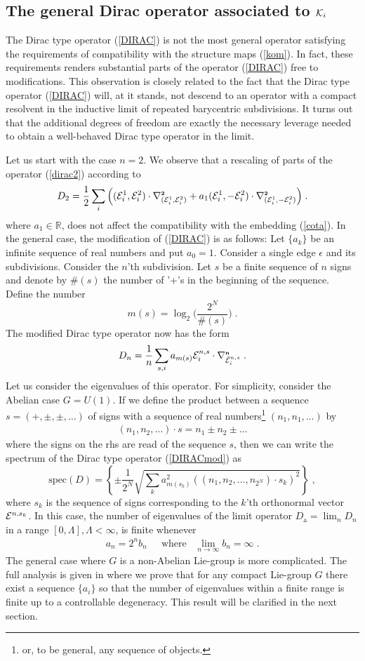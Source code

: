 \documentclass[12pt]{article}
\newcommand{\ba}{\begin{eqnarray}}
\newcommand{\ea}{\end{eqnarray}}
\def\e{\epsilon}
\def\ce{{\cal E}}
\def\ck{{\cal K}}
\newcommand{\nablato}{\nabla^{\mbox{\tiny\bf 2}}}
\begin{document}
\subsection{The general Dirac operator associated to $\ck_i$}

The Dirac type operator (\ref{DIRAC}) is not the most general operator satisfying the requirements of compatibility with the structure maps (\ref{kom}). In fact, these requirements renders substantial parts of the operator (\ref{DIRAC}) free to modifications. This observation is closely related to the fact that the Dirac type operator (\ref{DIRAC}) will, at it stands, not descend to an operator with a compact resolvent in the inductive limit of repeated barycentric subdivisions. It turns out that the additional degrees of freedom are exactly the necessary leverage needed to obtain a well-behaved Dirac type operator in the limit.


Let us start with the case $n=2$. We observe that a rescaling of parts of the operator (\ref{dirac2}) according to
\ba
D_2=\frac{1}{2}\sum_i\Big( (\ce^1_i,\ce^2_i)\cdot\nablato_{(\ce^1_i,\ce^2_i)} + a_1 (\ce^1_i,-\ce^2_i)\cdot\nablato_{(\ce^1_i,-\ce^2_i)}\Big)\;.
\label{dirac3}
\ea
where $a_1\in\mathbb{R}$, does not affect the compatibility with the embedding (\ref{cota}). In the general case, the modification of (\ref{DIRAC}) is as follows: Let $\{a_k\}$ be an infinite sequence of real numbers and put $a_0=1$. Consider a single edge $\e$ and its subdivisions. Consider the $n$'th subdivision. Let $s$ be a finite sequence of $n$ signs and denote by $\#(s)$ the number of '+'s in the beginning of the sequence. Define the number
\[
m(s)=\log_2\Big(\frac{2^N}{\#(s)} \Big)\;.
\]
The modified Dirac type operator now has the form
\ba
D_n = \frac{1}{n}\sum_{s,i}a_{m(s)}\ce^{n,s}_i\cdot \nabla^{\mbox{\tiny\bf n}}_{\hat{\ce}^{n,s}_i}\;.
\label{DIRACmod}
\ea
Let us consider the eigenvalues of this operator. For simplicity, consider the Abelian case $G=U(1)$. If we define the product between a sequence $s=(+,\pm,\pm,\ldots)$ of signs with a sequence of real numbers\footnote{or, to be general, any sequence of objects.} $(n_1,n_1,\ldots)$ by
\ba
(n_1,n_2,\ldots)\cdot s =n_1\pm n_2\pm \ldots
\label{cdot}\ea
where the signs on the rhs are read of the sequence $s$, then we can write the spectrum of the Dirac type operator (\ref{DIRACmod}) as
\[
\mbox{spec}(D) =\left\{\pm \frac{1}{2^N}\sqrt{\sum_{k}a^2_{m(s_k)}((n_1,n_2,\dots,n_{2^N})\cdot s_k)^2}\right\}\;,
\]
where $s_k$ is the sequence of signs corresponding to the $k$'th orthonormal vector $\ce^{n,s_k}$. In this case, the number of eigenvalues of the limit operator $D_{\smalltriangleup}=\lim_n D_n$ in a range $[0,\Lambda],\Lambda<\infty$, is finite whenever
\ba 
a_n = 2^n b_n\;\,\quad \mbox{where} \;\;\; \lim_{n\rightarrow\infty} b_n=\infty\;.
\label{CONDITION}
\ea
The general case where $G$ is a non-Abelian Lie-group is more complicated. The full analysis is given in \cite{Aastrup} where we prove that for any compact Lie-group $G$ there exist a sequence $\{a_i\}$ so that the number of eigenvalues within a finite range is finite up to a controllable degeneracy. This result will be clarified in the next section.
\end{document}
